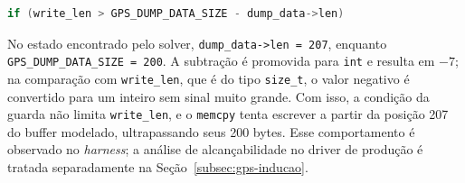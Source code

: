 \begin{lstlisting}[language=C,basicstyle=\ttfamily\scriptsize,frame=none,numbers=none]
if (write_len > GPS_DUMP_DATA_SIZE - dump_data->len)
\end{lstlisting}

No estado encontrado pelo solver, \texttt{dump\_data->len = 207}, enquanto
\texttt{GPS\_DUMP\_DATA\_SIZE = 200}. A subtração é promovida para
\texttt{int} e resulta em $-7$; na comparação com \texttt{write\_len}, que é
do tipo \texttt{size\_t}, o valor negativo é convertido para um inteiro sem
sinal muito grande. Com isso, a condição da guarda não limita
\texttt{write\_len}, e o \texttt{memcpy} tenta escrever a partir da posição
207 do buffer modelado, ultrapassando seus 200 bytes. Esse comportamento é
observado no \textit{harness}; a análise de alcançabilidade no driver de
produção é tratada separadamente na Seção~\ref{subsec:gps-inducao}.


